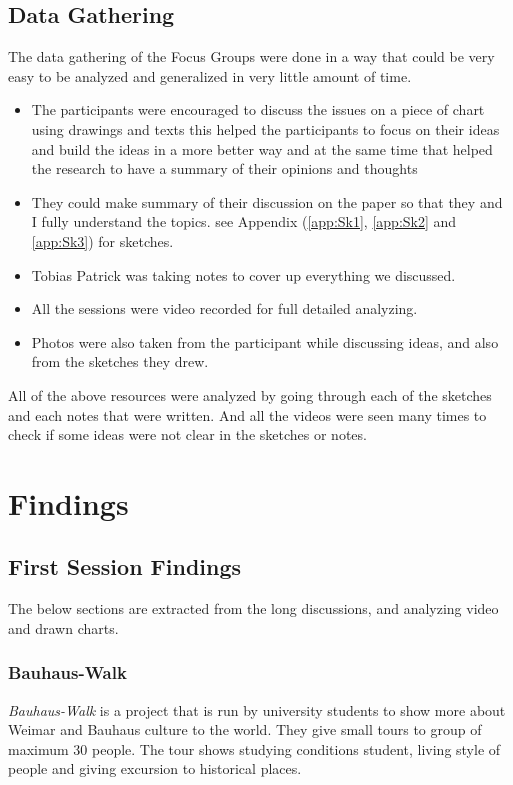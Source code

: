 \subsection{Data Gathering}
The data gathering of the Focus Groups were done in a way that could be very easy to be analyzed and generalized in very little amount of time. 


\begin {itemize}
\item   The participants were encouraged to discuss the issues on a piece of chart using drawings and texts this helped the participants to focus on their ideas and build the ideas in a more better way and at the same time that helped the research to have a summary of their opinions and thoughts 
\item   They could make summary of their discussion on the paper so that they and I fully understand the topics. see Appendix (\ref{app:Sk1}, \ref{app:Sk2} and \ref{app:Sk3}) for sketches.
\item   Tobias Patrick was taking notes to cover up everything we discussed.
\item   All the sessions were video recorded for full detailed analyzing. 
\item Photos were also taken from the participant while discussing ideas, and also from the sketches they drew.
\end{itemize}


All of the above resources were analyzed by going through each of the sketches and each notes that were written. And all the videos were seen many times to check if some ideas were not clear in the sketches or notes. 


\section{Findings}

\subsection {First Session Findings}
The below sections are extracted from the long discussions, and analyzing video and drawn charts.


\subsubsection{Bauhaus-Walk}
\emph{Bauhaus-Walk} is a project that is run by university students to show more about Weimar and Bauhaus culture to the world. They give small tours to group of maximum 30 people. The tour shows studying conditions student, living style of people and giving excursion to historical places.

